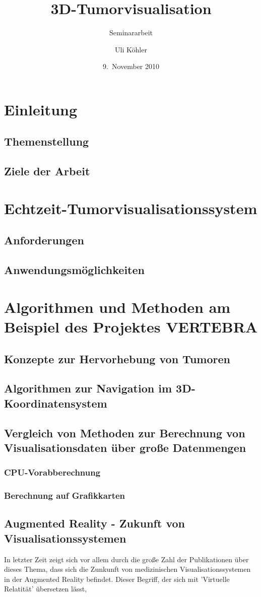 \documentclass[a4paper]{scrartcl}
\title{3D-Tumorvisualisation}
\subtitle{Seminararbeit}
\author{Uli Köhler}
\date{9.~November 2010}
\begin{document}
\tableofcontents
\section{Einleitung}
\subsection{Themenstellung}
\subsection{Ziele der Arbeit}
\section{Echtzeit-Tumorvisualisationssystem}
\subsection{Anforderungen}
\subsection{Anwendungsmöglichkeiten}
\section{Algorithmen und Methoden am Beispiel des Projektes VERTEBRA}
\subsection{Konzepte zur Hervorhebung von Tumoren}
\subsection{Algorithmen zur Navigation im 3D-Koordinatensystem}
\subsection{Vergleich von Methoden zur Berechnung von Visualisationsdaten über große Datenmengen}
\subsubsection{CPU-Vorabberechnung}
\subsubsection{Berechnung auf Grafikkarten}
\subsection{Augmented Reality - Zukunft von Visualisationssystemen}
In letzter Zeit zeigt sich vor allem durch die große Zahl der Publikationen über dieses Thema, dass sich die Zunkunft von medizinischen
Visualisationssystemen in der Augmented Reality befindet. Dieser Begriff, der sich mit 'Virtuelle Relatität' übersetzen lässt, \cite{Botden2009}
\appendix
\end{document}
